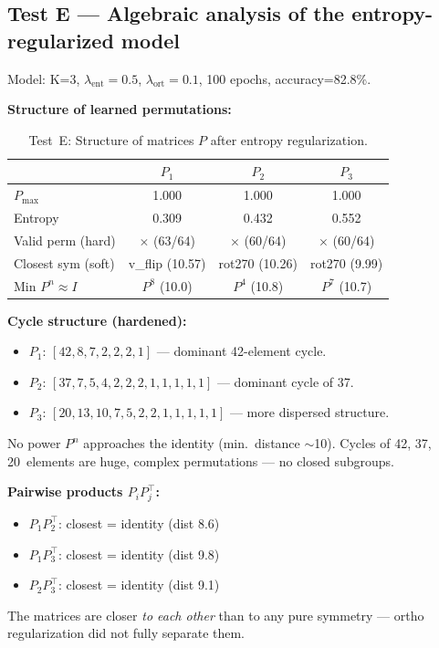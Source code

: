 \subsection{Test E --- Algebraic analysis of the entropy-regularized model}

Model: K=3, $\lambda_{\text{ent}}=0.5$, $\lambda_{\text{ort}}=0.1$, 100 epochs, accuracy=82.8\%.

\textbf{Structure of learned permutations:}

\begin{table}[h]
\centering
\caption{Test~E: Structure of matrices $P$ after entropy regularization.}
\begin{tabular}{lccc}
\hline
 & $P_1$ & $P_2$ & $P_3$ \\
\hline
$P_{\max}$ & 1.000 & 1.000 & 1.000 \\
Entropy & 0.309 & 0.432 & 0.552 \\
Valid perm (hard) & $\times$ (63/64) & $\times$ (60/64) & $\times$ (60/64) \\
Closest sym (soft) & v\_flip (10.57) & rot270 (10.26) & rot270 (9.99) \\
Min $P^n \approx I$ & $P^8$ (10.0) & $P^4$ (10.8) & $P^7$ (10.7) \\
\hline
\end{tabular}
\end{table}

\textbf{Cycle structure (hardened):}
\begin{itemize}
    \item $P_1$: $[42, 8, 7, 2, 2, 2, 1]$ --- dominant 42-element cycle.
    \item $P_2$: $[37, 7, 5, 4, 2, 2, 2, 1, 1, 1, 1, 1]$ --- dominant cycle of 37.
    \item $P_3$: $[20, 13, 10, 7, 5, 2, 2, 1, 1, 1, 1, 1]$ --- more dispersed structure.
\end{itemize}

No power $P^n$ approaches the identity (min.\ distance $\sim$10). Cycles of 42, 37, 20~elements are huge, complex permutations --- no closed subgroups.

\textbf{Pairwise products $P_iP_j^\top$:}
\begin{itemize}
    \item $P_1 P_2^\top$: closest = identity (dist 8.6)
    \item $P_1 P_3^\top$: closest = identity (dist 9.8)
    \item $P_2 P_3^\top$: closest = identity (dist 9.1)
\end{itemize}

The matrices are closer \emph{to each other} than to any pure symmetry --- ortho regularization did not fully separate them.
